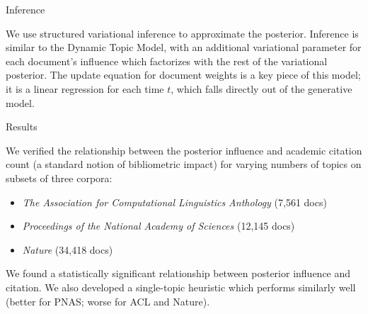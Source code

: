\documentclass[final,t]{beamer}
\begin{document}
\begin{frame}{}
\begin{columns}[t]
    
    \begin{column}{.32\linewidth}

\begin{block}{Inference}
\hspace{-1.8cm} \parbox{0.93\textwidth}{
We use structured variational inference to approximate the posterior.
Inference is similar to the Dynamic Topic Model, with an additional
variational parameter for each document's influence which factorizes with
the rest of the variational posterior.  The update equation for
document weights is a key piece of this model; it is a
linear regression for each time $t$, which falls directly out of the generative model.
}
  \end{block}

\begin{block}{Results}
\hspace{-1.8cm} \parbox{.93\textwidth} { We verified the relationship
  between the posterior influence and academic citation count (a
  standard notion of bibliometric impact) for varying numbers of
  topics on subsets of three corpora:
\begin{itemize}
  \item \emph{The Association for Computational Linguistics Anthology} (7,561 docs)
  \item \emph{Proceedings of the National Academy of Sciences} (12,145 docs)
  \item \emph{Nature} (34,418 docs)
\end{itemize}
We found a statistically significant relationship between posterior
influence and citation.  We also developed a single-topic heuristic
which performs similarly well (better for PNAS; worse for ACL and
Nature).
}
\end{block}




\end{column}
\end{columns}
\end{frame}
\end{document}
